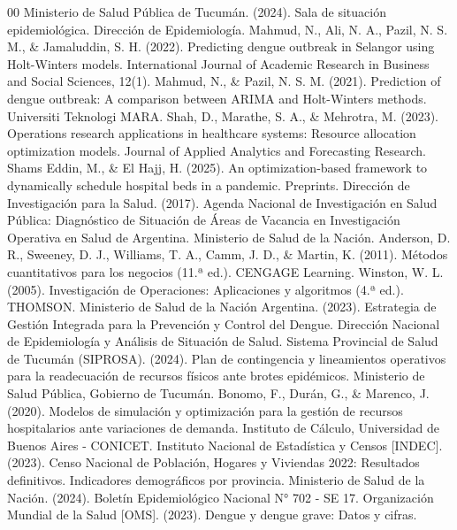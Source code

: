 \documentclass[conference]{IEEEtran}
\begin{document}
\vfill\newpage
\begin{thebibliography}{00}
     Ministerio de Salud Pública de Tucumán. (2024). Sala de situación epidemiológica. Dirección de Epidemiología.
     Mahmud, N., Ali, N. A., Pazil, N. S. M., \& Jamaluddin, S. H. (2022). Predicting dengue outbreak in Selangor using Holt-Winters models. International Journal of Academic Research in Business and Social Sciences, 12(1).
     Mahmud, N., \& Pazil, N. S. M. (2021). Prediction of dengue outbreak: A comparison between ARIMA and Holt-Winters methods. Universiti Teknologi MARA.
     Shah, D., Marathe, S. A., \& Mehrotra, M. (2023). Operations research applications in healthcare systems: Resource allocation optimization models. Journal of Applied Analytics and Forecasting Research.
     Shams Eddin, M., \& El Hajj, H. (2025). An optimization-based framework to dynamically schedule hospital beds in a pandemic. Preprints.
     Dirección de Investigación para la Salud. (2017). Agenda Nacional de Investigación en Salud Pública: Diagnóstico de Situación de Áreas de Vacancia en Investigación Operativa en Salud de Argentina. Ministerio de Salud de la Nación.
     Anderson, D. R., Sweeney, D. J., Williams, T. A., Camm, J. D., \& Martin, K. (2011). Métodos cuantitativos para los negocios (11.ª ed.). CENGAGE Learning.
     Winston, W. L. (2005). Investigación de Operaciones: Aplicaciones y algoritmos (4.ª ed.). THOMSON.
     Ministerio de Salud de la Nación Argentina. (2023). Estrategia de Gestión Integrada para la Prevención y Control del Dengue. Dirección Nacional de Epidemiología y Análisis de Situación de Salud.
     Sistema Provincial de Salud de Tucumán (SIPROSA). (2024). Plan de contingencia y lineamientos operativos para la readecuación de recursos físicos ante brotes epidémicos. Ministerio de Salud Pública, Gobierno de Tucumán.
     Bonomo, F., Durán, G., \& Marenco, J. (2020). Modelos de simulación y optimización para la gestión de recursos hospitalarios ante variaciones de demanda. Instituto de Cálculo, Universidad de Buenos Aires - CONICET.
     Instituto Nacional de Estadística y Censos [INDEC]. (2023). Censo Nacional de Población, Hogares y Viviendas 2022: Resultados definitivos. Indicadores demográficos por provincia.
     Ministerio de Salud de la Nación. (2024). Boletín Epidemiológico Nacional N° 702 - SE 17.
     Organización Mundial de la Salud [OMS]. (2023). Dengue y dengue grave: Datos y cifras.

\end{thebibliography}
\end{document}
